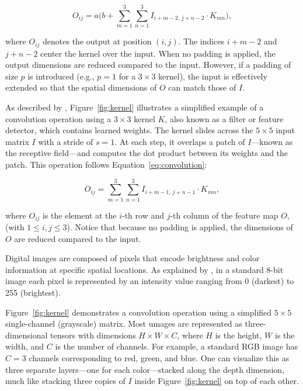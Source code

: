 \documentclass[a4paper,10pt,twocolumn]{article}
\numberwithin{figure}{section}
\numberwithin{table}{section}
\begin{document}
\begin{equation}
    O_{ij} = a\Biggl( b + \sum_{m=1}^{3} \sum_{n=1}^{3} I_{i+m-2,\,j+n-2} \cdot K_{mn} \Biggr),
    \label{eq:conv_with_bias}
\end{equation}

where \(O_{ij}\) denotes the output at position \((i,j)\). The indices \(i+m-2\) and \(j+n-2\) center the kernel over the input. When no padding is applied, the output dimensions are reduced compared to the input. However, if a padding of size \(p\) is introduced (e.g., \(p=1\) for a \(3 \times 3\) kernel), the input is effectively extended so that the spatial dimensions of \(O\) can match those of \(I\).



As described by \cite{VerdhanVaibhav2021CVUD}, Figure~\ref{fig:kernel} 
illustrates a  simplified example of a convolution operation using a
\(3 \times 3\) kernel \(K\), also known as a filter or feature detector, which contains learned weights.
The kernel slides across the \(5 \times 5\) input matrix \(I\) with a stride of \(s = 1\).
At each step, it overlaps a patch of \(I\)—known as the receptive field—and 
computes the dot product between its weights and the patch.
This operation follows Equation~\ref{eq:convolution}: 

\begin{equation}
    O_{ij} = \sum_{m=1}^{3} \sum_{n=1}^{3} I_{i+m-1,\,j+n-1} \cdot K_{mn},
    \label{eq:convolution}
\end{equation}
\vspace{0.1cm}

where \(O_{ij}\) is the element at the \(i\)-th row and \(j\)-th column of the feature map \(O\), 
(with \(1 \leq i,j \leq 3\)).
Notice that because no padding is applied, 
the dimensions of \(O\) are reduced compared 
to the input.

Digital images are composed of pixels that encode brightness and color information
 at specific spatial locations. As explained by \cite{10589380TEST}, 
 in a standard 8-bit image each pixel is represented by an intensity 
 value ranging from 0 (darkest) to 255 (brightest).

Figure~\ref{fig:kernel} demonstrates a convolution operation using 
a simplified \(5 \times 5\) single-channel (grayscale) matrix. 
Most umages are represented as three-dimensional
tensors with dimensions \(H \times W \times C\), where \(H\) is the 
height, \(W\) is the width, and \(C\) is the number of channels. 
For example, a standard RGB image has \(C=3\) channels corresponding to red, green, 
and blue\cite[p. 170]{prince2023understanding}. One can visualize this as three separate layers—one for 
each color—stacked along the depth dimension, much like stacking 
three copies of \(I\) inside Figure~\ref{fig:kernel} on top of each other.
\end{document}
